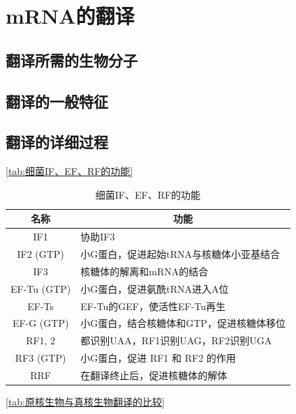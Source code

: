 \section{mRNA的翻译}

\subsection{翻译所需的生物分子}

\subsection{翻译的一般特征}

\subsection{翻译的详细过程}

\autoref{tab:细菌IF、EF、RF的功能}
\begin{table}
	\begin{tabularx}{\textwidth}{|c|X|}
		\hline
		\textbf{名称} & \multicolumn{1}{c|}{\textbf{功能}} \\ 
		\hline
		IF1 & 协助IF3 \\ 
		\hline
		IF2 (GTP) & 小G蛋白，促进起始tRNA与核糖体小亚基结合 \\ 
		\hline
		IF3 & 核糖体的解离和mRNA的结合 \\ 
		\hline\hline
		EF-Tu (GTP) & 小G蛋白，促进氨酰tRNA进入A位 \\ 
		\hline
		EF-Ts & EF-Tu的GEF，使活性EF-Tu再生 \\ 
		\hline
		EF-G (GTP) & 小G蛋白，结合核糖体和GTP，促进核糖体移位 \\ 
		\hline\hline
		RF1, 2 & 都识别UAA，RF1识别UAG，RF2识别UGA \\ 
		\hline
		RF3 (GTP) & 小G蛋白，促进 RF1 和 RF2 的作用 \\ 
		\hline
		RRF & 在翻译终止后，促进核糖体的解体 \\ 
		\hline
	\end{tabularx}
	\caption{细菌IF、EF、RF的功能}
	\label{tab:细菌IF、EF、RF的功能}
\end{table}

\autoref{tab:原核生物与真核生物翻译的比较}

